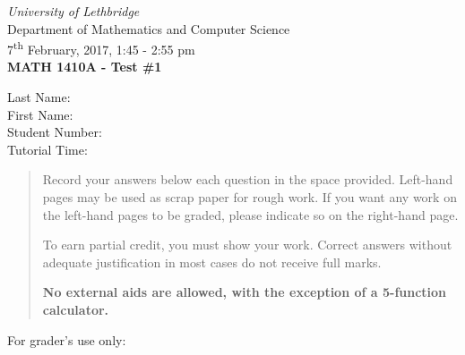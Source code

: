 \documentclass[12pt]{article}
\newcommand{\skipline}{\vspace{12pt}}
\begin{document}
\author{Instructor: Sean Fitzpatrick}
\thispagestyle{plain}
\begin{center}
\emph{University of Lethbridge}\\
Department of Mathematics and Computer Science\\
7\textsuperscript{th} February, 2017, 1:45 - 2:55 pm\\
{\bf MATH 1410A - Test \#1}\\
\end{center}
\skipline \skipline \skipline \noindent \skipline
Last Name:\underline{\hspace{353pt}}\\
\skipline
First Name:\underline{\hspace{350pt}}\\
\skipline
Student Number:\underline{\hspace{323pt}}\\
\skipline
Tutorial Time: \underline{\hspace{320pt}}\\


\vspace{0.5in}


\begin{quote}
  Record your answers below each question in the space provided.    Left-hand pages may be used as scrap paper for rough work.  If you want any work on the left-hand pages to be graded, please indicate so on the right-hand page.
 
 \bigskip
 
To earn partial credit, you must show your work. Correct answers without adequate justification in most cases do not receive full marks.

\bigskip

{\bf No external aids are allowed, with the exception of a 5-function calculator.}
\end{quote}


\vspace{0.5in}

For grader's use only:
\end{document}
